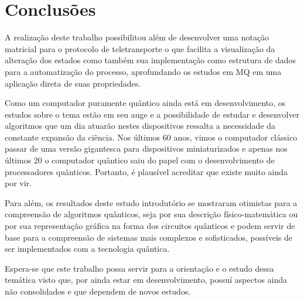 
\chapter{Conclusões}

A realização deste trabalho possibilitou além de desenvolver uma notação matricial para o protocolo de teletransporte o que facilita a visualização da alteração dos estados como também sua implementação como estrutura de dados para a automatização do processo, aprofundando os estudos em MQ em uma aplicação direta de suas propriedades.

Como um computador puramente quântico ainda está em desenvolvimento, os estudos sobre o tema estão em seu auge e a possibilidade de estudar e desenvolver algoritmos que um dia atuarão nestes dispositivos ressalta a necessidade da constante expansão da ciência. Nos últimos 60 anos, vimos o computador clássico passar de uma versão gigantesca para dispositivos miniaturizados e apenas nos últimos 20 o computador quântico saiu do papel com o desenvolvimento de processadores quânticos. Portanto, é plausível acreditar que existe muito ainda por vir.

Para além, os resultados deste estudo introdutório se mostraram otimistas para a compreensão de algoritmos quânticos, seja por sua descrição físico-matemática ou por sua representação gráfica na forma dos circuitos quânticos e podem servir de base para a compreensão de sistemas mais complexos e sofisticados, possíveis de ser implementados com a tecnologia quântica.

Espera-se que este trabalho possa servir para a orientação e o estudo dessa temática visto que, por ainda estar em desenvolvimento, possuí aspectos ainda não consolidados e que dependem de novos estudos.
